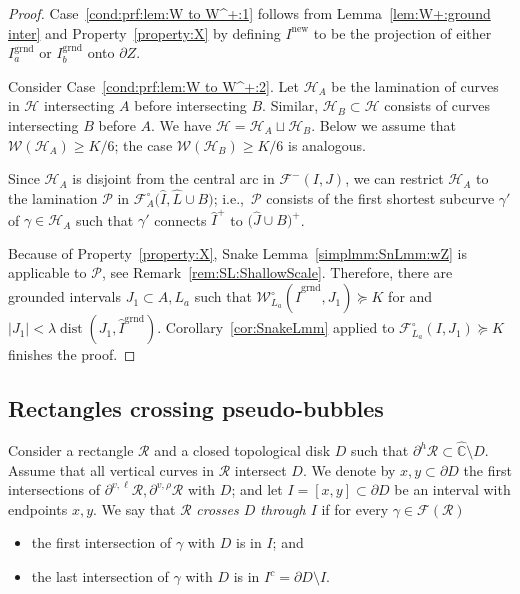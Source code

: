 \documentclass{amsart}
\newcommand{\1}{{\mathbb 1 }}
\newcommand{\FamH}{{\mathcal H}}
\newcommand{\FamP}{{\mathcal P}}
\newcommand{\Fam}{{\mathcal F}}
\newcommand{\Width}{{\mathcal W}}
\newcommand\RR{\mathcal{R}}
\newcommand\PP{\mathcal{P}}
\newcommand{\grnd}{{\operatorname{grnd}}}
\newcommand\new{{\operatorname{new}}}
\newcommand{\wC}{\widehat{\mathbb{C}}}
\theoremstyle{remark}
\numberwithin{equation}{section}
\theoremstyle{definition}
\newcommand{\dist}{\operatorname{dist}}
\begin{document}
\begin{proof}
Case~\ref{cond:prf:lem:W to W^+:1} follows from Lemma~\ref{lem:W+:ground inter} and Property~\ref{property:X} by defining $I^\new$ to be the projection of either $I^\grnd_a$ or $I^\grnd_b$ onto $\partial Z$.


Consider Case~\ref{cond:prf:lem:W to W^+:2}. Let $\FamH_A$ be the lamination of curves in $\FamH$ intersecting $A$ before intersecting $B$. Similar, $\FamH_B\subset \FamH$ consists of curves intersecting $B$ before $A$. We have $\FamH=\FamH_A\sqcup \FamH_B$. Below we assume that $\Width(\FamH_A)\ge K/6$; the case $\Width(\FamH_B)\ge K/6$ is analogous.

Since $\FamH_A$ is disjoint from the central arc in $\Fam^-(I,J)$, we can restrict $\FamH_A$ to the lamination $\FamP$ in $\Fam^\circ_A \big(\widehat I , \widehat L \cup B \big)$; i.e.,~$\FamP$ consists of the first shortest subcurve $\gamma'$ of $\gamma\in \FamH_A$ such that $\gamma'$ connects $\widehat I^+$ to $\big(\widehat J\cup B\big)^+$.


Because of Property~\ref{property:X}, Snake Lemma~\ref{simplmm:SnLmm:wZ} is applicable to $\PP$, see Remark~\ref{rem:SL:ShallowScale}. Therefore, there are grounded intervals $J_1\subset A,L_a$ such that $\Width^\circ_{L_a} (\widehat I^\grnd,J_1)\succeq K$ for and $|J_1|<\lambda \dist(J_1,\widehat I^\grnd)$. Corollary~\ref{cor:SnakeLmm} applied to $\Fam^\circ_{L_a} (I,J_1)\succeq K$ finishes the proof.
\end{proof}

\subsection{Rectangles crossing pseudo-bubbles} \label{sss:RR through D} Consider a rectangle $\RR$ and a closed topological disk $D$ such that $\partial^h\RR\subset \wC\setminus  D$. Assume that all vertical curves in $\RR$ intersect $D$. We denote by $x,y\subset \partial D$ the first intersections of $\partial ^{v, \ell}\RR,\partial ^{v, \rho}\RR$ with $D$; and let $I=[x,y]\subset \partial D$ be an interval with endpoints $x,y$. We say that $\RR$ \emph{crosses $D$ through $I$} if for every $\gamma\in \Fam(\RR)$
\begin{itemize}
\item the first intersection of $\gamma$ with $D$ is in $I$; and
\item the last intersection of $\gamma$ with $D$ is in $I^c=\partial D\setminus I$.
\end{itemize}
\end{document}
